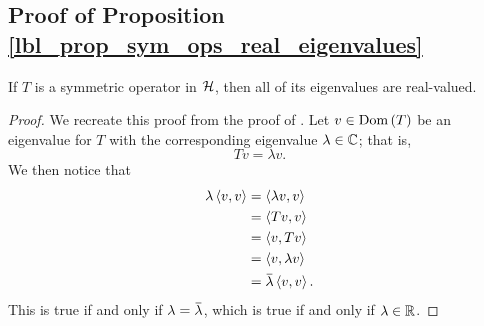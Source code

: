 \subsection{Proof of Proposition \eqref{lbl_prop_sym_ops_real_eigenvalues}} \label{proof_lbl_prop_sym_ops_real_eigenvalues}

\begin{proposition}
  If $T$ is a symmetric operator in $\mathcal{H}$, then all of its eigenvalues are real-valued.
\end{proposition}
\begin{proof}
  We recreate this proof from the proof of {\cite[Chapter 41 Theorem 2]{glazman}}. Let $v \in \operatorname{Dom}\left(T\right)$ be an eigenvalue for $T$ with the corresponding eigenvalue $\lambda \in \mathbb{C}$; that is,
  \begin{equation*}
    Tv = \lambda v.
  \end{equation*}
  We then notice that
  \begin{align*}
    \lambda \ip{v, v}
    &=
    \ip{\lambda v, v} \\
    &=
    \ip{Tv, v} \\
    &=
    \ip{v, Tv} \\
    &=
    \ip{v, \lambda v} \\
    &=
    \conjugate{\lambda}\ip{v, v}.
  \end{align*}
  This is true if and only if $\lambda = \conjugate{\lambda}$, which is true if and only if $\lambda \in \mathbb{R}$.
\end{proof}
